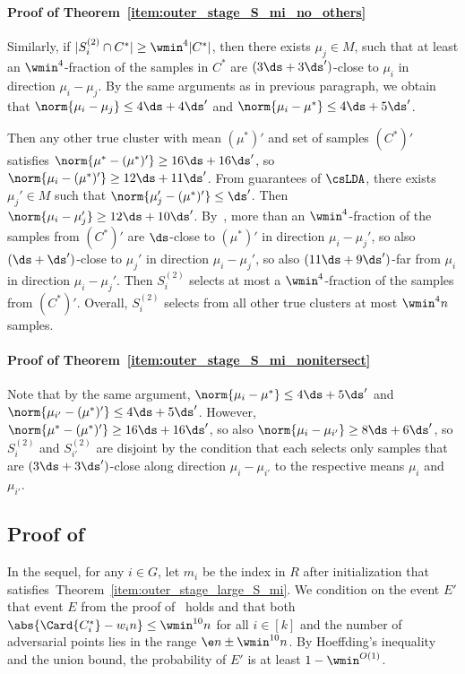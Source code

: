 \paragraph{Proof of Theorem~\ref{item:outer_stage_S_mi_no_others}}
Similarly, if $|S_i^{(2)} \cap C^*| \geq \wmin^4 |C^*|$, then there exists $\mu_j \in M$, 
    such that at least an $\wmin^4$-fraction of the samples in $C^*$ are $(3\ds+3\ds')$-close to $\mu_i$ in direction $\mu_i - \mu_j$.
    By the same arguments as in previous paragraph, we obtain that $\norm{\mu_i - \mu_j} \leq 4\ds+4\ds'$ and $\norm{\mu_i - \mu^*} \leq 4\ds+5\ds'$.
    
    Then any other true cluster with mean $(\mu^*)'$ and set of samples $(C^*)'$ satisfies $\norm{\mu^* - (\mu^*)'} \geq 16\ds+16\ds'$, so $\norm{\mu_i - (\mu^*)'} \geq 12\ds+11\ds'$.
    From guarantees of \(\csLDA\), there exists $\mu_j' \in M$ such that $\norm{\mu_j' - (\mu^*)'} \leq \ds'$. Then $\norm{\mu_i - \mu_j'} \geq 12\ds+10\ds'$. 
    By~, more than an $\wmin^4$-fraction of the samples from $(C^*)'$ are $\ds$-close to $(\mu^*)'$ in direction $\mu_i-\mu_j'$, so also $(\ds+\ds')$-close to $\mu_j'$ in direction $\mu_i-\mu_j'$, so also $(11\ds+9\ds')$-far from $\mu_i$ in direction $\mu_i-\mu_j'$.
    Then $S_i^{(2)}$ selects at most a $\wmin^4$-fraction of the samples from $(C^*)'$.
    Overall, $S_i^{(2)}$ selects from all other true clusters at most $\wmin^4 n$ samples.
\paragraph{Proof of Theorem~\ref{item:outer_stage_S_mi_nonitersect}}
Note that by the same argument, $\norm{\mu_i - \mu^*} \leq 4\ds+5\ds'$ and $\norm{\mu_{i'} - (\mu^*)'} \leq 4\ds+5\ds'$.
    However, $\norm{\mu^* - (\mu^*)'} \geq 16\ds+16\ds'$, so also $\norm{\mu_i - \mu_{i'}} \geq 8\ds+6\ds'$, so $S_i^{(2)}$ and $S_{i'}^{(2)}$ are disjoint by the condition that each selects only samples that are $(3\ds+3\ds')$-close along direction $\mu_i - \mu_{i'}$ to the respective means $\mu_i$ and $\mu_{i'}$.    


\subsection{Proof of~}

In the sequel, for any \(i \in G\), let \(m_i\) be the index in \(R\) after initialization that satisfies~Theorem~\ref{item:outer_stage_large_S_mi}. We condition on the event \(E'\) that event \(E\) from the proof of~ holds and that both \(\abs{\Card{C_i^*} - w_i n} \leq \wmin^{10} n\) for all \(i \in [k]\) and the number of adversarial points lies in the range \(\e n \pm \wmin^{10} n\).
By Hoeffding's inequality and the union bound, the probability of $E'$ is at least $1-\wmin^{O(1)}$.
